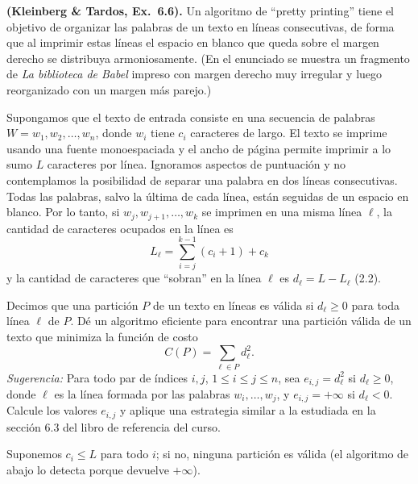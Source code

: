 \begin{enunciado}
\textbf{(Kleinberg \& Tardos, Ex.~6.6).} Un algoritmo de ``pretty printing'' tiene el objetivo de organizar las palabras de un texto en líneas consecutivas, de forma que al imprimir estas líneas el espacio en blanco que queda sobre el margen derecho se distribuya armoniosamente. (En el enunciado se muestra un fragmento de \emph{La biblioteca de Babel} impreso con margen derecho muy irregular y luego reorganizado con un margen más parejo.)

Supongamos que el texto de entrada consiste en una secuencia de palabras $W=w_1,w_2,\dots,w_n$, donde $w_i$ tiene $c_i$ caracteres de largo. El texto se imprime usando una fuente monoespaciada y el ancho de página permite imprimir a lo sumo $L$ caracteres por línea. Ignoramos aspectos de puntuación y no contemplamos la posibilidad de separar una palabra en dos líneas consecutivas. Todas las palabras, salvo la última de cada línea, están seguidas de un espacio en blanco. Por lo tanto, si $w_j,w_{j+1},\dots,w_k$ se imprimen en una misma línea $\ell$, la cantidad de caracteres ocupados en la línea es
\[
L_\ell=\sum_{i=j}^{k-1}(c_i+1)+c_k \tag{2.1}
\]
y la cantidad de caracteres que ``sobran'' en la línea $\ell$ es $d_\ell = L - L_\ell$ \hfill (2.2).

Decimos que una partición $P$ de un texto en líneas es válida si $d_\ell\ge 0$ para toda línea $\ell$ de $P$. Dé un algoritmo eficiente para encontrar una partición válida de un texto que minimiza la función de costo
\[
C(P)=\sum_{\ell\in P} d_\ell^2. \tag{2.3}
\]
\emph{Sugerencia:} Para todo par de índices $i,j$, $1\le i\le j\le n$, sea $e_{i,j}=d_\ell^2$ si $d_\ell\ge 0$, donde $\ell$ es la línea formada por las palabras $w_i,\dots,w_j$, y $e_{i,j}=+\infty$ si $d_\ell<0$. Calcule los valores $e_{i,j}$ y aplique una estrategia similar a la estudiada en la sección 6.3 del libro de referencia del curso.
\end{enunciado}


Suponemos $c_i\le L$ para todo $i$; si no, ninguna partición es válida (el algoritmo de abajo lo detecta porque devuelve $+\infty$).

